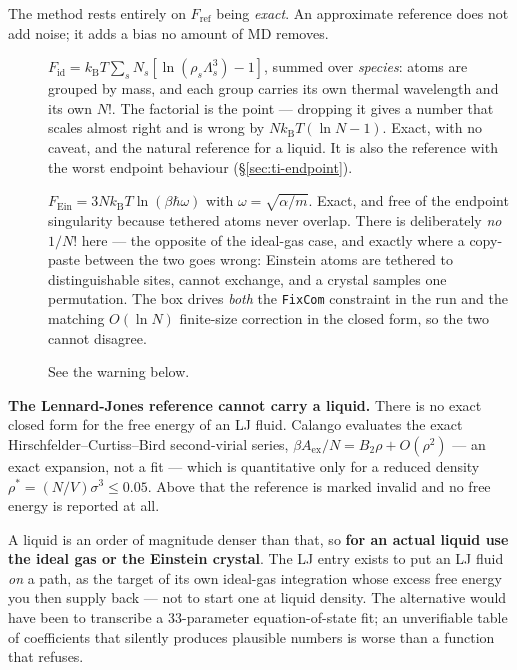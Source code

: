 The method rests entirely on $F_\mathrm{ref}$ being \emph{exact}. An approximate
reference does not add noise; it adds a bias no amount of MD removes.

\begin{description}
  \item[] $F_\mathrm{id} = k_\mathrm{B}T
    \sum_s N_s [\ln(\rho_s\Lambda_s^3) - 1]$, summed over \emph{species}: atoms
    are grouped by mass, and each group carries its own thermal wavelength and
    its own $N!$. The factorial is the point --- dropping it gives a number that
    scales almost right and is wrong by $Nk_\mathrm{B}T(\ln N - 1)$. Exact, with
    no caveat, and the natural reference for a liquid. It is also the reference
    with the worst endpoint behaviour (\S\ref{sec:ti-endpoint}).
  \item[]
    $F_\mathrm{Ein} = 3Nk_\mathrm{B}T\ln(\beta\hbar\omega)$ with
    $\omega = \sqrt{\alpha/m}$. Exact, and free of the endpoint singularity
    because tethered atoms never overlap. There is deliberately \emph{no}
    $1/N!$ here --- the opposite of the ideal-gas case, and exactly where a
    copy-paste between the two goes wrong: Einstein atoms are tethered to
    distinguishable sites, cannot exchange, and a crystal samples one
    permutation. The  box drives \emph{both}
    the \texttt{FixCom} constraint in the run and the matching $O(\ln N)$
    finite-size correction in the closed form, so the two cannot disagree.
  \item[] See the warning below.
\end{description}

\begin{calwarn}
\textbf{The Lennard-Jones reference cannot carry a liquid.} There is no exact
closed form for the free energy of an LJ fluid. Calango evaluates the exact
Hirschfelder--Curtiss--Bird second-virial series, $\beta A_\mathrm{ex}/N =
B_2\rho + O(\rho^2)$ --- an exact expansion, not a fit --- which is quantitative
only for a reduced density $\rho^* = (N/V)\sigma^3 \le 0.05$. Above that
the reference is marked invalid and no free energy is reported at all.

A liquid is an order of magnitude denser than that, so \textbf{for an actual
liquid use the ideal gas or the Einstein crystal}. The LJ entry exists to put an
LJ fluid \emph{on} a path, as the target of its own ideal-gas integration whose
excess free energy you then supply back --- not to start one at liquid density.
The alternative would have been to transcribe a 33-parameter equation-of-state
fit; an unverifiable table of coefficients that silently produces plausible
numbers is worse than a function that refuses.
\end{calwarn}

